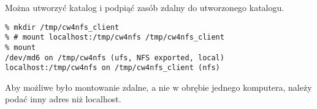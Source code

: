 \documentclass[a4paper,11pt]{article}
\begin{document}
Można utworzyć katalog i podpiąć zasób zdalny do utworzonego katalogu.

\footnotesize\begin{verbatim}
% mkdir /tmp/cw4nfs_client
% # mount localhost:/tmp/cw4nfs /tmp/cw4nfs_client
% mount
/dev/md6 on /tmp/cw4nfs (ufs, NFS exported, local)
localhost:/tmp/cw4nfs on /tmp/cw4nfs_client (nfs)
\end{verbatim}\normalsize

Aby możliwe było montowanie zdalne, a nie w obrębie jednego komputera, należy podać inny adres niż localhost.
\end{document}
